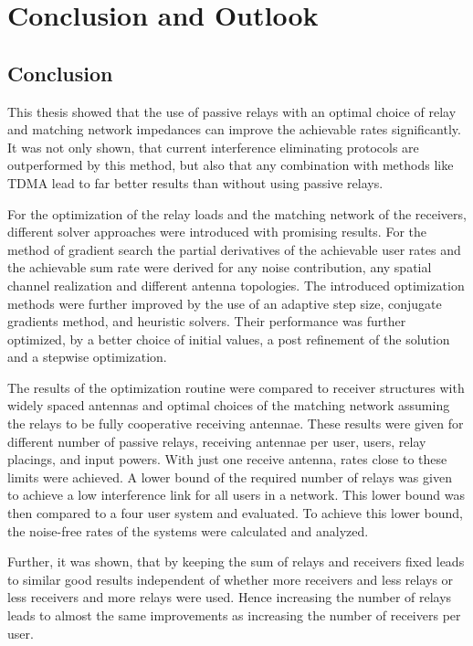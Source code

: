 \chapter{Conclusion and Outlook}

\section{Conclusion}
\label{sec:conclusion}
This thesis showed that the use of passive relays with an optimal choice of relay and matching network impedances can improve the achievable rates significantly.
It was not only shown, that current interference eliminating protocols are outperformed by this method, but also that any combination with methods like TDMA lead to far better results than without using passive relays.

For the optimization of the relay loads and the matching network of the receivers, different solver approaches were introduced with promising results.
For the method of gradient search the partial derivatives of the achievable user rates and the achievable sum rate were derived for any noise contribution, any spatial channel realization and  different antenna topologies.
The introduced optimization methods were further improved by the use of an adaptive step size, conjugate gradients method, and heuristic solvers.
Their performance was further optimized, by a better choice of initial values, a post refinement of the solution and a stepwise optimization. 

The results of the optimization routine were compared to receiver structures with widely spaced antennas and optimal choices of the matching network assuming the relays to be fully cooperative receiving antennae.
These results were given for  different number of passive relays, receiving antennae per user, users, relay placings, and input powers.
With just one receive antenna, rates close to these limits were achieved.
A lower bound of the required number of relays was given to achieve a low interference link for all users in  a network.
This lower bound was then compared to a four user system and evaluated.
To achieve this lower bound, the noise-free rates of the systems were calculated and analyzed.

Further, it was shown, that by keeping the sum of relays and receivers fixed leads to similar good results independent of whether more receivers and less relays or less receivers and more relays were used.
Hence increasing the number of relays leads to almost the same improvements as increasing the number of receivers per user.


